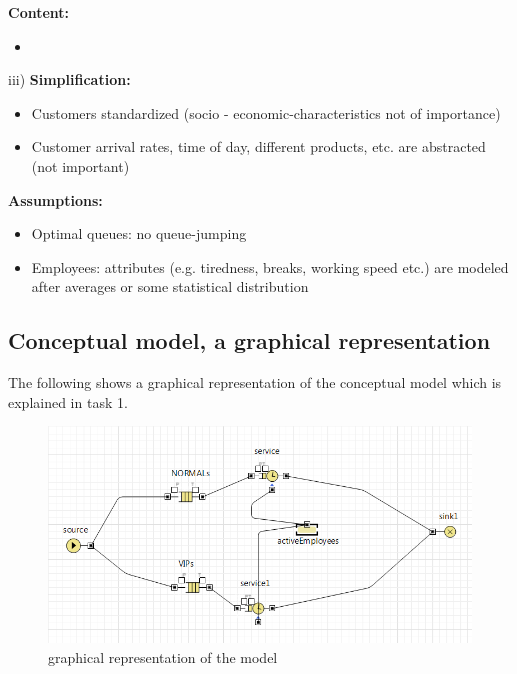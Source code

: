 	\textbf{Content:}
		\begin{itemize}	
		  \item 
		\end{itemize}

iii)
\textbf{Simplification:}
	\begin{itemize}
	  \item Customers standardized (socio - economic-characteristics not of importance)
	  \item Customer arrival rates, time of day, different products, etc. are abstracted (not important)
	\end{itemize}
	
\textbf{Assumptions:}
	\begin{itemize}
	  \item Optimal queues: no queue-jumping
	  \item Employees: attributes  (e.g. tiredness, breaks, working speed etc.) are modeled after averages or some 
	        statistical distribution
	\end{itemize}


\subsection{Conceptual model, a graphical representation}
The following shows a graphical representation of the conceptual model which is explained  in task 1.
	\begin{figure}[!htb]
  \centering   
  \includegraphics[width=1\textwidth]{pics/ub4/dia} 
  \caption{graphical representation of the model}
  \label{fig:dia} 
 \end{figure}


